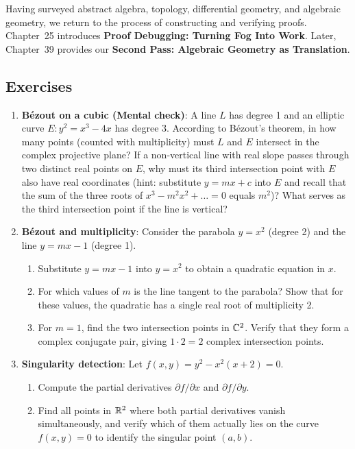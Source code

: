 Having surveyed abstract algebra, topology, differential geometry, and algebraic geometry, we return to the process of constructing and verifying proofs. Chapter~25 introduces \textbf{Proof Debugging: Turning Fog Into Work}. Later, Chapter~39 provides our \textbf{Second Pass: Algebraic Geometry as Translation}.

\subsection{Exercises}

\begin{enumerate}
\item \textbf{B\'ezout on a cubic (Mental check)}: A line $L$ has degree 1 and an elliptic curve $E: y^2 = x^3 - 4x$ has degree 3. According to B\'ezout's theorem, in how many points (counted with multiplicity) must $L$ and $E$ intersect in the complex projective plane? If a non-vertical line with real slope passes through two distinct real points on $E$, why must its third intersection point with $E$ also have real coordinates (hint: substitute $y = mx + c$ into $E$ and recall that the sum of the three roots of $x^3 - m^2 x^2 + \dots = 0$ equals $m^2$)? What serves as the third intersection point if the line is vertical?
\item \textbf{B\'ezout and multiplicity}: Consider the parabola $y = x^2$ (degree 2) and the line $y = mx - 1$ (degree 1).
\begin{enumerate}
\item Substitute $y = mx - 1$ into $y = x^2$ to obtain a quadratic equation in $x$.
\item For which values of $m$ is the line tangent to the parabola? Show that for these values, the quadratic has a single real root of multiplicity 2.
\item For $m = 1$, find the two intersection points in $\mathbb{C}^2$. Verify that they form a complex conjugate pair, giving $1 \cdot 2 = 2$ complex intersection points.
\end{enumerate}
\item \textbf{Singularity detection}: Let $f(x, y) = y^2 - x^2(x + 2) = 0$.
\begin{enumerate}
\item Compute the partial derivatives $\partial f / \partial x$ and $\partial f / \partial y$.
\item Find all points in $\mathbb{R}^2$ where both partial derivatives vanish simultaneously, and verify which of them actually lies on the curve $f(x, y) = 0$ to identify the singular point $(a, b)$.

\end{enumerate}
\end{enumerate}
